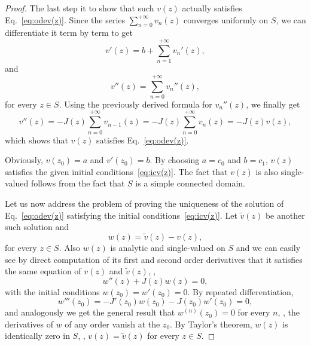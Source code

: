 \begin{proof}
   The last step 
   it to show that such $v(z)$ actually satisfies
   Eq.~\eqref{eq:odev(z)}.
   Since the series $\sum_{n=0}^{+\infty} v_{n}(z)$ converges uniformly on $S$, 
   we can differentiate it term by term to get
   \begin{dmath*}
      v'(z) = b + \sum_{n=1}^{+\infty} v_{n}'(z) ,
   \end{dmath*}
   and 
   \begin{dmath*}
      v''(z) = \sum_{n=0}^{+\infty} v_{n}''(z) ,
   \end{dmath*}
   for every $z\in S$.
   Using the previously derived formula for $v_{n}''(z)$, we finally get
   \begin{dmath*}[compact]
      v''(z) = - J(z) \sum_{n=0}^{+\infty}  v_{n-1}(z) = -J(z) \sum_{n=0}^{+\infty}
      v_{n}(z) = - J(z) v(z) ,
   \end{dmath*}
   which shows that $v(z)$ satisfies Eq.~\eqref{eq:odev(z)}.

   Obviously, 
   $v(z_{0})=a$ and $v'(z_{0}) = b$. By choosing $a=c_{0}$ and $b=c_{1}$, 
   $v(z)$ satisfies the given initial  
   conditions~\eqref{eq:icv(z)}. The fact that $v(z)$ is also single-valued follows
   from the fact that $S$ is a simple connected domain.

   Let us now address 
   the problem of proving  the uniqueness of the solution of
   Eq.~\eqref{eq:odev(z)} satisfying the initial conditions~\eqref{eq:icv(z)}.
   Let $\tilde{v}(z)$ be another such solution and 
   \begin{dmath*}
      w (z) = \tilde{v}(z)  - v(z) ,
   \end{dmath*}
   for every $z\in S$.
   Also $w(z)$ is analytic and single-valued on $S$ and 
   we can easily see by direct computation of its first and second order
   derivatives that it satisfies the same equation of $v(z)$ and
   $\tilde{v}(z)$, \ie,
   \begin{dmath*}
      w''(z) + J(z) w(z) = 0,
   \end{dmath*}
   with the initial conditions $w(z_{0}) = w'(z_{0}) =0$.  By repeated
   differentiation, 
   \begin{dmath*}[compact]
      w'''(z_{0}) = - J'(z_{0}) w(z_{0} ) - J(z_{0}) w'(z_{0} ) = 0,
   \end{dmath*}
   and analogously  we get the general result that $w^{(n)}(z_{0})=0 $ for every
   $n$, \ie,  the derivatives of $w$ of any order vanish at the $z_{0}$.  By
   Taylor's theorem, $w(z)$ is identically zero in $S$, \ie, $v(z) = \tilde{v}(z)$
   for every $z\in S$. 
\end{proof}


